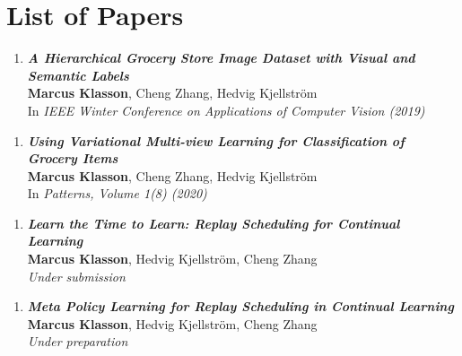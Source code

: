 
\chapter{List of Papers}
\label{chap:list_of_papers}

\begin{enumerate}[\textbf{A}]
	\item \textbf{\textit{A Hierarchical Grocery Store Image Dataset with Visual and Semantic Labels}} \\
	\textbf{Marcus Klasson}, Cheng Zhang, Hedvig Kjellström \\
	In \textit{IEEE Winter Conference on Applications of Computer Vision (2019)}
\end{enumerate}

\begin{enumerate}[\textbf{B}]
	\item \textbf{\textit{Using Variational Multi-view Learning for Classification of Grocery Items}} \\
	\textbf{Marcus Klasson}, Cheng Zhang, Hedvig Kjellström \\
	In \textit{Patterns, Volume 1(8) (2020)}
\end{enumerate}

\begin{enumerate}[\textbf{C}]
	\item \textbf{\textit{Learn the Time to Learn: Replay Scheduling for Continual Learning}} \\
	\textbf{Marcus Klasson}, Hedvig Kjellström, Cheng Zhang \\
	\textit{Under submission}
\end{enumerate}

\begin{enumerate}[\textbf{D}]
	\item \textbf{\textit{Meta Policy Learning for Replay Scheduling in Continual Learning}} \\
	\textbf{Marcus Klasson}, Hedvig Kjellström, Cheng Zhang \\
	\textit{Under preparation}
\end{enumerate}



\begin{comment}
Other contributions by the author not included in the thesis.
\begin{enumerate}[I]
	\setcounter{enumi}{1}
	\item \textbf{\textit{Title of paper}} \\
	\textbf{First author}, Second author \\
	\textit{Journal (year)}
\end{enumerate}
\end{comment}
